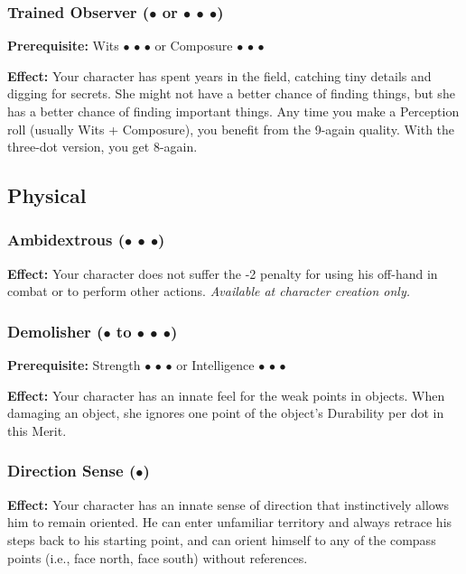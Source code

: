 \documentclass["../Misguided by Starlight.tex"]{subfiles}
\begin{document}
	\subsubsection{Trained Observer ($\bullet$ or $\bullet$ $\bullet$ $\bullet$)} %
		\textbf{Prerequisite:} Wits $\bullet$ $\bullet$ $\bullet$ or Composure $\bullet$ $\bullet$ $\bullet$
		
		\textbf{Effect:} Your character has spent years in the field, catching tiny details and digging for secrets. She might not have a better chance of finding things, but she has a better chance of finding important things. Any time you make a Perception roll (usually Wits + Composure), you benefit from the 9-again quality. With the three-dot version, you get 8-again.
	
\subsection{Physical}
	\subsubsection{Ambidextrous ($\bullet$ $\bullet$ $\bullet$)} %
		\textbf{Effect:} Your character does not suffer the -2 penalty for using his off-hand in combat or to perform other actions. \emph{Available at character creation only.}
	
	\subsubsection{Demolisher ($\bullet$ to $\bullet$ $\bullet$ $\bullet$)} %
		\textbf{Prerequisite:} Strength $\bullet$ $\bullet$ $\bullet$ or Intelligence $\bullet$ $\bullet$ $\bullet$
		
		\textbf{Effect:} Your character has an innate feel for the weak points in objects. When damaging an object, she ignores one point of the object’s Durability per dot in this Merit.
	
	\subsubsection{Direction Sense ($\bullet$)} %
		\textbf{Effect:} Your character has an innate sense of direction that instinctively allows him to remain oriented. He can enter unfamiliar territory and always retrace his steps back to his starting point, and can orient himself to any of the compass points (i.e., face north, face south) without references.
	
\end{document}
